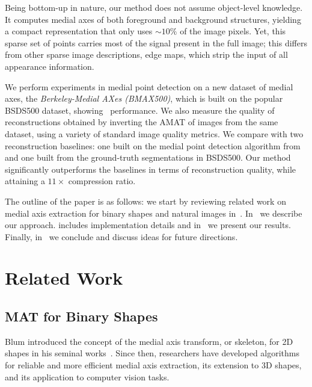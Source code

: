 \documentclass[10pt,twocolumn,letterpaper]{article}
\begin{document}
Being bottom-up in nature, our method does not assume object-level knowledge.
It computes medial axes of both foreground and background structures, 
yielding a compact representation that only uses $\sim 10\%$ of the image pixels.
Yet, this sparse set of points carries most of the signal present in the full image;
this differs from other sparse image descriptions, \eg edge maps, which strip the input of all appearance information.

We perform experiments in medial point detection on a new dataset of medial axes, the 
\emph{Berkeley-Medial AXes (BMAX500)}, which is built on the popular BSDS500 dataset, showing \sota\ performance.
We also measure the quality of reconstructions  obtained by inverting the AMAT of images from the same dataset, 
using  a variety of standard image quality metrics.
We compare with two reconstruction baselines: one built on the medial point detection algorithm from~\cite{tsogkas2012learning}
and one built from the ground-truth segmentations in BSDS500.
Our method significantly outperforms the baselines in terms of reconstruction quality, while attaining a $11\times$ compression ratio.

The outline of the paper is as follows: we start by reviewing related work on medial axis extraction for binary shapes
and natural images in~.
In~ we describe our approach.
 includes implementation details and in~ we present our results.
Finally, in~ we conclude and discuss ideas for future directions.


\section{Related Work}\label{sec:related}
\subsection{MAT for Binary Shapes}\label{sec:related:binary}
Blum introduced the concept of the medial axis transform, or skeleton, for 2D shapes
in his seminal works~\cite{blum1967transformation,blum1973biological}.
Since then, researchers have developed algorithms for reliable
and more efficient medial axis extraction, its extension to 3D shapes, and its application
to computer vision tasks.
\end{document}
